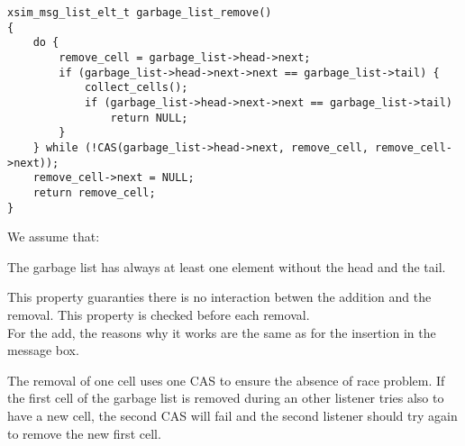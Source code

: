 \begin{verbatim}
xsim_msg_list_elt_t garbage_list_remove()
{
    do {
        remove_cell = garbage_list->head->next;
        if (garbage_list->head->next->next == garbage_list->tail) {
            collect_cells();
            if (garbage_list->head->next->next == garbage_list->tail)
                return NULL;
        }
    } while (!CAS(garbage_list->head->next, remove_cell, remove_cell->next));
    remove_cell->next = NULL;
    return remove_cell;
}
\end{verbatim}



We assume that: 
\begin{myproperty}
\label{garbage_list}
The garbage list has always at least one element without the head 
and the tail. 
\end{myproperty}
This property guaranties there is no interaction betwen the addition and the removal.
This property is checked before each removal.\\

For the add, the reasons why it works are the same as for the insertion in the message box.

The removal of one cell uses one CAS to ensure the absence of race problem. If the first
cell of the garbage list is removed during an other listener tries also to have a new
cell, the second CAS will fail and the second listener should try again to remove the 
new first cell.



